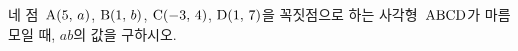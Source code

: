 네 점~$\mathrm{A}(5,\mkern3mu a)$, $\mathrm{B}(1,\mkern3mu b)$, $\mathrm{C}(-3,\mkern3mu 4)$, $\mathrm{D}(1,\mkern3mu 7)$을 꼭짓점으로 하는 사각형~$\mathrm{ABCD}$가 마름모일 때, $ab$의 값을 구하시오.
